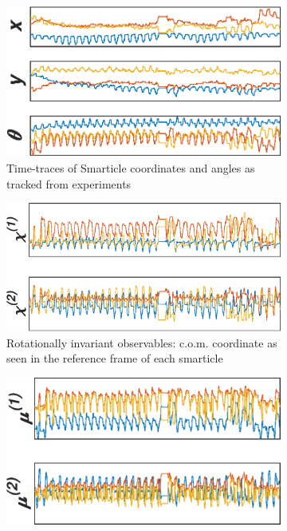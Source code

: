 \documentclass[reprint,prx]{revtex4-1}
\renewcommand{\=}[1]{\stackrel{#1}{=}} %
\renewcommand{\(}{\left (}
\renewcommand{\)}{\right  )}
\renewcommand{\[}{\left [}
\renewcommand{\]}{\right ]}
\newcommand{\<}{\left <}
\renewcommand{\>}{\right >}
\theoremstyle{definition}
\theoremstyle{remark}
\begin{document}
\begin{figure} 
	\begin{subfigure}[t]{0.4\textwidth}
		\includegraphics[width=1\textwidth]{crdDat.eps}
		\caption{Time-traces of Smarticle coordinates and angles as tracked from experiments \label{fig:crdDat}}
	\end{subfigure}
	\begin{subfigure}[t]{0.4\textwidth}
		\includegraphics[width=1\textwidth]{relDat.eps}
		\caption{Rotationally invariant observables: c.o.m. coordinate as seen in the reference frame of each smarticle \label{fig:relDat}}
	\end{subfigure}
	\begin{subfigure}[t]{0.4\textwidth}
		\includegraphics[width=1\textwidth]{piDat.eps}

\end{subfigure}
\end{figure}
\end{document}
